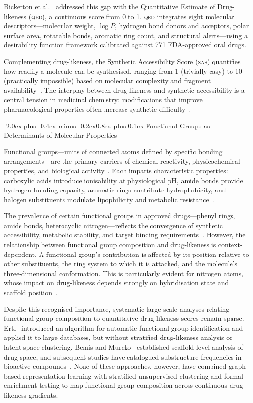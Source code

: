 \documentclass[10pt,a4paper,twocolumn]{article}
\makeatletter
\providecommand{\qed}{}
\let\qed\relax
\newcommand{\qedscore}{\textsc{qed}}
\let\qed\qedscore
\newcommand{\sas}{\textsc{sas}}
\newcommand{\logp}{\ensuremath{\log P}}
\renewcommand\subsection{\@startsection{subsection}{2}{\z@}%
  {-2.0ex plus -0.4ex minus -0.2ex}{0.8ex plus 0.1ex}%
  {\normalfont\large\bfseries}}
\makeatother
\begin{document}
Bickerton et al.~\cite{bickerton2012} addressed this gap with the Quantitative Estimate of Drug-likeness (\qed{}), a continuous score from 0 to 1. \qed{} integrates eight molecular descriptors---molecular weight, $\logp{}$, hydrogen bond donors and acceptors, polar surface area, rotatable bonds, aromatic ring count, and structural alerts---using a desirability function framework calibrated against 771 FDA-approved oral drugs.

Complementing drug-likeness, the Synthetic Accessibility Score (\sas{}) quantifies how readily a molecule can be synthesised, ranging from 1 (trivially easy) to 10 (practically impossible) based on molecular complexity and fragment availability~\cite{ertl2009}. The interplay between drug-likeness and synthetic accessibility is a central tension in medicinal chemistry: modifications that improve pharmacological properties often increase synthetic difficulty~\cite{roughley2011}.

\subsection{Functional Groups as Determinants of Molecular Properties}

Functional groups---units of connected atoms defined by specific bonding arrangements---are the primary carriers of chemical reactivity, physicochemical properties, and biological activity~\cite{anslyn2006}. Each imparts characteristic properties: carboxylic acids introduce ionisability at physiological pH, amide bonds provide hydrogen bonding capacity, aromatic rings contribute hydrophobicity, and halogen substituents modulate lipophilicity and metabolic resistance~\cite{maslehat2018}.

The prevalence of certain functional groups in approved drugs---phenyl rings, amide bonds, heterocyclic nitrogen---reflects the convergence of synthetic accessibility, metabolic stability, and target binding requirements~\cite{he2010}. However, the relationship between functional group composition and drug-likeness is context-dependent. A functional group's contribution is affected by its position relative to other substituents, the ring system to which it is attached, and the molecule's three-dimensional conformation. This is particularly evident for nitrogen atoms, whose impact on drug-likeness depends strongly on hybridisation state and scaffold position~\cite{pennington2023}.

Despite this recognised importance, systematic large-scale analyses relating functional group composition to quantitative drug-likeness scores remain sparse. Ertl~\cite{ertl2017} introduced an algorithm for automatic functional group identification and applied it to large databases, but without stratified drug-likeness analysis or latent-space clustering. Bemis and Murcko~\cite{bemis1996} established scaffold-level analysis of drug space, and subsequent studies have catalogued substructure frequencies in bioactive compounds~\cite{he2010}. None of these approaches, however, have combined graph-based representation learning with stratified unsupervised clustering and formal enrichment testing to map functional group composition across continuous drug-likeness gradients.
\end{document}
